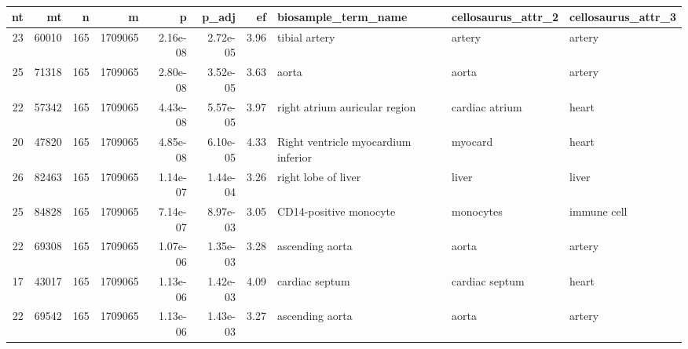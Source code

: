 \begin{landscape}
\begin{table}[h!]
\vspace*{-1cm}
\capstart
\centering
\begin{minipage}{\captionwidth}
    \caption[enriched samples]{}
    \label{tab:enriched_tissues_all}
\end{minipage}
    \begin{tabular}{r|r|r|r|r|r|r|l|l|l}
    nt & mt     & n   & m       & p        & p\_adj   & ef & biosample\_term\_name                                  & cellosaurus\_attr\_2 & cellosaurus\_attr\_3 \\ \hline
    23 & 60010  & 165 & 1709065 & 2.16e-08 & 2.72e-05 & 3.96              & tibial artery                                          & artery               & artery               \\
    25 & 71318  & 165 & 1709065 & 2.80e-08 & 3.52e-05 & 3.63              & aorta                                                  & aorta                & artery               \\
    22 & 57342  & 165 & 1709065 & 4.43e-08 & 5.57e-05 & 3.97              & right atrium auricular region                          & cardiac atrium       & heart                \\
    20 & 47820  & 165 & 1709065 & 4.85e-08 & 6.10e-05 & 4.33              & Right ventricle myocardium inferior                    & myocard              & heart                \\
    26 & 82463  & 165 & 1709065 & 1.14e-07 & 1.44e-04 & 3.26              & right lobe of liver                                    & liver                & liver                \\
    25 & 84828  & 165 & 1709065 & 7.14e-07 & 8.97e-03 & 3.05              & CD14-positive monocyte                                 & monocytes            & immune cell          \\
    22 & 69308  & 165 & 1709065 & 1.07e-06 & 1.35e-03 & 3.28              & ascending aorta                                        & aorta                & artery               \\
    17 & 43017  & 165 & 1709065 & 1.13e-06 & 1.42e-03 & 4.09              & cardiac septum                                         & cardiac septum       & heart                \\
    22 & 69542  & 165 & 1709065 & 1.13e-06 & 1.43e-03 & 3.27              & ascending aorta                                        & aorta                & artery               \\

\end{tabular}
\end{table}
\end{landscape}
